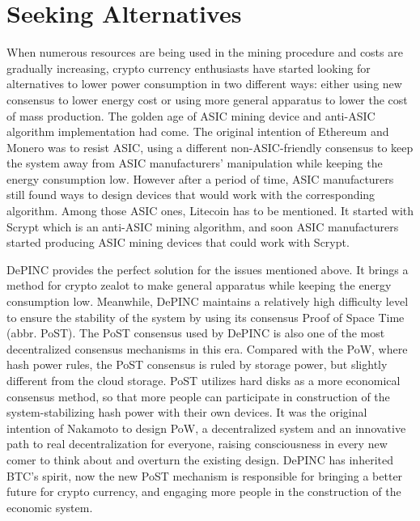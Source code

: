 \section{Seeking Alternatives}
\begin{flushleft}
    When numerous resources are being used in the mining procedure and costs are gradually increasing, crypto currency enthusiasts have started looking for alternatives to lower power consumption in two different ways: either using new consensus to lower energy cost or using more general apparatus to lower the cost of mass production. The golden age of ASIC mining device and anti-ASIC algorithm implementation had come. The original intention of Ethereum and Monero was to resist ASIC, using a different non-ASIC-friendly consensus to keep the system away from ASIC manufacturers’ manipulation while keeping the energy consumption low. However after a period of time, ASIC manufacturers still found ways to design devices that would work with the corresponding algorithm. Among those ASIC ones, Litecoin has to be mentioned. It started with Scrypt which is an anti-ASIC mining algorithm, and soon ASIC manufacturers started producing ASIC mining devices that could work with Scrypt.
\end{flushleft}
\begin{flushleft}
    DePINC provides the perfect solution for the issues mentioned above. It brings a method for crypto zealot to make general apparatus while keeping the energy consumption low. Meanwhile, DePINC maintains a relatively high difficulty level to ensure the stability of the system by using its consensus Proof of Space Time (abbr. PoST). The PoST consensus used by DePINC is also one of the most decentralized consensus mechanisms in this era. Compared with the PoW, where hash power rules, the PoST consensus is ruled by storage power, but slightly different from the cloud storage. PoST utilizes hard disks as a more economical consensus method, so that more people can participate in construction of the system-stabilizing hash power with their own devices. It was the original intention of Nakamoto to design PoW, a decentralized system and an innovative path to real decentralization for everyone, raising consciousness in every new comer to think about and overturn the existing design. DePINC has inherited BTC’s spirit, now the new PoST mechanism is responsible for bringing a better future for crypto currency, and engaging more people in the construction of the economic system.
\end{flushleft}
